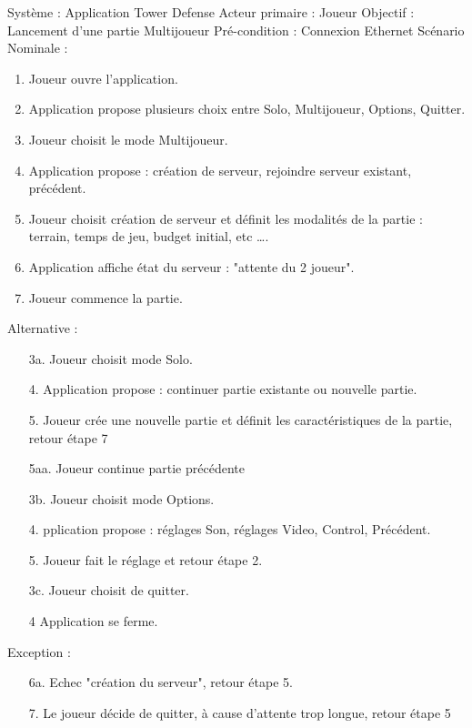 \documentclass[12pt, letterpaper]{article}
\begin{document}
{\noindent Système : Application Tower Defense\newline
Acteur primaire :  Joueur\newline
Objectif : Lancement d'une partie Multijoueur\newline
Pré-condition : Connexion Ethernet\newline
Scénario Nominale :
\begin{enumerate}
\item Joueur ouvre l’application.
\item Application propose plusieurs choix entre Solo, Multijoueur, Options, Quitter.
\item Joueur choisit le mode Multijoueur.
\item Application propose : création de serveur, rejoindre serveur existant, précédent.
\item	Joueur choisit création de serveur et définit les modalités de la partie : terrain, temps de jeu, budget initial, etc \dots .
\item	Application  affiche état du serveur : "attente du 2 joueur".
\item	Joueur commence la partie.
\end{enumerate}
Alternative :

\begin{itemize}
\item[3a.]Joueur choisit mode Solo.
\item[4.]Application propose : continuer partie existante ou nouvelle partie.
\item[5.]Joueur crée une nouvelle partie et définit les caractéristiques de la partie, retour
                   étape 7
\item[]
\item[5aa.]Joueur continue partie précédente
\item[]
\item[3b.]Joueur choisit mode Options.
\item[4.]pplication propose : réglages Son, réglages Video, Control, Précédent.
\item[5.] Joueur fait le réglage et retour étape 2.
\item[]
\item[3c.]Joueur choisit de quitter.
\item[4]Application se ferme.
\end{itemize}
Exception :
	
\begin{itemize}
\item[6a.]Echec "création du serveur", retour étape 5.
\item[7.]Le joueur décide de quitter, à cause d'attente trop longue, retour étape 5
\end{itemize}
\clearpage
\begin{landscape}
\BgThispage

\end{landscape}}
\end{document}
